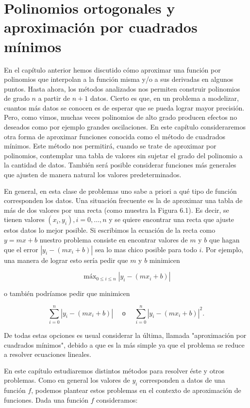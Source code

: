 \documentclass[10pt]{article}
\begin{document}
\section*{Polinomios ortogonales y aproximación por cuadrados mínimos}
En el capítulo anterior hemos discutido cómo aproximar una función por polinomios que interpolan a la función misma y/o a sus derivadas en algunos puntos. Hasta ahora, los métodos analizados nos permiten construir polinomios de grado $n$ a partir de $n+1$ datos. Cierto es que, en un problema a modelizar, cuantos más datos se conocen es de esperar que se pueda lograr mayor precisión. Pero, como vimos, muchas veces polinomios de alto grado producen efectos no deseados como por ejemplo grandes oscilaciones. En este capítulo consideraremos otra forma de aproximar funciones conocida como el método de cuadrados mínimos. Este método nos permitirá, cuando se trate de aproximar por polinomios, contemplar una tabla de valores sin sujetar el grado del polinomio a la cantidad de datos. También será posible considerar funciones más generales que ajusten de manera natural los valores predeterminados.

En general, en esta clase de problemas uno sabe a priori a qué tipo de función corresponden los datos. Una situación frecuente es la de aproximar una tabla de más de dos valores por una recta (como muestra la Figura 6.1). Es decir, se tienen valores $\left(x_{i}, y_{i}\right), i=0, \ldots, n$ y se quiere encontrar una recta que ajuste estos datos lo mejor posible. Si escribimos la ecuación de la recta como $y=m x+b$ nuestro problema consiste en encontrar valores de $m$ y $b$ que hagan que el error $\left|y_{i}-\left(m x_{i}+b\right)\right|$ sea lo mas chico posible para todo $i$. Por ejemplo, una manera de lograr esto sería pedir que $m$ y $b$ minimicen

$$
\operatorname{máx}_{0 \leq i \leq n}\left|y_{i}-\left(m x_{i}+b\right)\right|
$$

o también podríamos pedir que minimicen

$$
\sum_{i=0}^{n}\left|y_{i}-\left(m x_{i}+b\right)\right| \quad \text { о } \quad \sum_{i=0}^{n}\left|y_{i}-\left(m x_{i}+b\right)\right|^{2} .
$$

De todas estas opciones es usual considerar la última, llamada "aproximación por cuadrados mínimos", debido a que es la más simple ya que el problema se reduce a resolver ecuaciones lineales.

En este capítulo estudiaremos distintos métodos para resolver éste y otros problemas. Como en general los valores de $y_{i}$ corresponden a datos de una función $f$, podemos plantear estos problemas en el contexto de aproximación de funciones. Dada una función $f$ consideramos:
\end{document}
